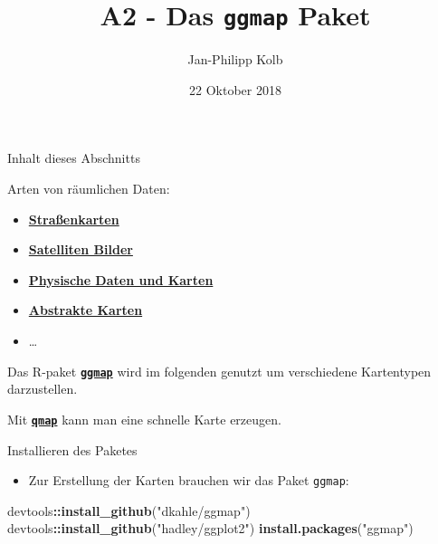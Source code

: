 \documentclass[ignorenonframetext,]{beamer}
\title{A2 - Das \texttt{ggmap} Paket}
\author{Jan-Philipp Kolb}
\date{22 Oktober 2018}
\newenvironment{Shaded}{\begin{snugshade}}{\end{snugshade}}
\newcommand{\KeywordTok}[1]{\textcolor[rgb]{0.13,0.29,0.53}{\textbf{#1}}}
\newcommand{\NormalTok}[1]{#1}
\newcommand{\OperatorTok}[1]{\textcolor[rgb]{0.81,0.36,0.00}{\textbf{#1}}}
\newcommand{\StringTok}[1]{\textcolor[rgb]{0.31,0.60,0.02}{#1}}
\providecommand{\tightlist}{%
  \setlength{\itemsep}{0pt}\setlength{\parskip}{0pt}}
\begin{document}
\frame{\titlepage}

\begin{frame}[fragile]{Inhalt dieses Abschnitts}
\protect\hypertarget{inhalt-dieses-abschnitts}{}

Arten von räumlichen Daten:

\begin{itemize}
\tightlist
\item
  \href{https://www.nceas.ucsb.edu/~frazier/RSpatialGuides/ggmap/ggmapCheatsheet.pdf}{\textbf{Straßenkarten}}
\item
  \href{http://www.mostlymuppet.com/tag/maps/}{\textbf{Satelliten
  Bilder}}
\item
  \href{http://gis.stackexchange.com/questions/3083/what-makes-a-map-beautiful/45518\#45518}{\textbf{Physische
  Daten und Karten}}
\item
  \href{http://www.designfaves.com/2014/03/abstracted-maps-reveal-cities-personalities}{\textbf{Abstrakte
  Karten}}
\item
  \ldots{}
\end{itemize}

Das R-paket
\href{http://journal.r-project.org/archive/2013-1/kahle-wickham.pdf}{\textbf{\texttt{ggmap}}}
wird im folgenden genutzt um verschiedene Kartentypen darzustellen.

Mit
\href{http://www.inside-r.org/packages/cran/ggmap/docs/qmap}{\textbf{\texttt{qmap}}}
kann man eine schnelle Karte erzeugen.

\end{frame}

\begin{frame}[fragile]{Installieren des Paketes}
\protect\hypertarget{installieren-des-paketes}{}

\begin{itemize}
\tightlist
\item
  Zur Erstellung der Karten brauchen wir das Paket \texttt{ggmap}:
\end{itemize}

\begin{Shaded}
\begin{Highlighting}[]
\NormalTok{devtools}\OperatorTok{::}\KeywordTok{install_github}\NormalTok{(}\StringTok{"dkahle/ggmap"}\NormalTok{)}
\NormalTok{devtools}\OperatorTok{::}\KeywordTok{install_github}\NormalTok{(}\StringTok{"hadley/ggplot2"}\NormalTok{)}
\KeywordTok{install.packages}\NormalTok{(}\StringTok{"ggmap"}\NormalTok{)}
\end{Highlighting}
\end{Shaded}

\end{frame}
\end{document}
